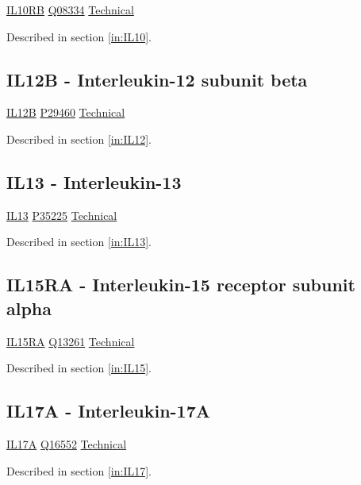 \href{https://en.wikipedia.org/wiki/Interleukin\_10\_receptor,\_beta\_subunit}{IL10RB}
\href{http://www.uniprot.org/uniprot/Q08334}{Q08334}
\href{https://olink.com/products-services/target/protein/?assayID=5054}{Technical}

Described in section \ref{in:IL10}.

\subsection{IL12B - Interleukin-12 subunit beta}

\href{https://en.wikipedia.org/wiki/Interleukin-12\_subunit\_beta}{IL12B}
\href{http://www.uniprot.org/uniprot/P29460}{P29460}
\href{https://olink.com/products-services/target/protein/?assayID=5105}{Technical}

Described in section \ref{in:IL12}.

\subsection{IL13 - Interleukin-13}

\href{https://en.wikipedia.org/wiki/Interleukin\_13}{IL13}
\href{http://www.uniprot.org/uniprot/P35225}{P35225}
\href{https://olink.com/products-services/target/protein/?assayID=5103}{Technical}

Described in section \ref{in:IL13}.

\subsection{IL15RA - Interleukin-15 receptor subunit alpha}

\href{https://en.wikipedia.org/wiki/Interleukin_15_receptor,_alpha_subunit}{IL15RA}
\href{http://www.uniprot.org/uniprot/Q13261}{Q13261}
\href{https://olink.com/products-services/target/protein/?assayID=5053}{Technical}

Described in section \ref{in:IL15}.

\subsection{IL17A - Interleukin-17A}

\href{https://en.wikipedia.org/wiki/IL17A}{IL17A}
\href{http://www.uniprot.org/uniprot/Q16552}{Q16552}
\href{https://olink.com/products-services/target/protein/?assayID=5076}{Technical}

Described in section \ref{in:IL17}.

